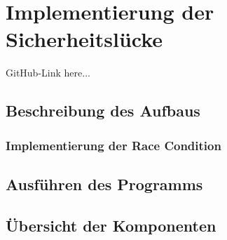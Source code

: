 \chapter{Implementierung der Sicherheitsl\"ucke}
\label{chap:5}

GitHub-Link here...

\section{Beschreibung des Aufbaus}


\subsection{Implementierung der Race Condition}


\section{Ausführen des Programms}


\section{Übersicht der Komponenten}
